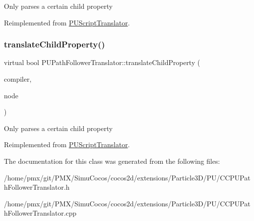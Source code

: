 Only parses a certain child property 

Reimplemented from \hyperlink{classPUScriptTranslator_a0374d83a8a04e57918975d525e0f8fe8}{P\+U\+Script\+Translator}.

\mbox{\label{classPUPathFollowerTranslator_a5628c773dc8c5a80074467e4237e4760}} 
\subsubsection{\texorpdfstring{translate\+Child\+Property()}{translateChildProperty()}\hspace{0.1cm}{\footnotesize\ttfamily [2/2]}}
{\footnotesize\ttfamily virtual bool P\+U\+Path\+Follower\+Translator\+::translate\+Child\+Property (\begin{DoxyParamCaption}\item[{\hyperlink{classPUScriptCompiler}{P\+U\+Script\+Compiler} $\ast$}]{compiler,  }\item[{\hyperlink{classPUAbstractNode}{P\+U\+Abstract\+Node} $\ast$}]{node }\end{DoxyParamCaption})\hspace{0.3cm}{\ttfamily [virtual]}}

Only parses a certain child property 

Reimplemented from \hyperlink{classPUScriptTranslator_a0374d83a8a04e57918975d525e0f8fe8}{P\+U\+Script\+Translator}.



The documentation for this class was generated from the following files\+:\begin{DoxyCompactItemize}
\item 
/home/pmx/git/\+P\+M\+X/\+Simu\+Cocos/cocos2d/extensions/\+Particle3\+D/\+P\+U/C\+C\+P\+U\+Path\+Follower\+Translator.\+h\item 
/home/pmx/git/\+P\+M\+X/\+Simu\+Cocos/cocos2d/extensions/\+Particle3\+D/\+P\+U/C\+C\+P\+U\+Path\+Follower\+Translator.\+cpp\end{DoxyCompactItemize}
